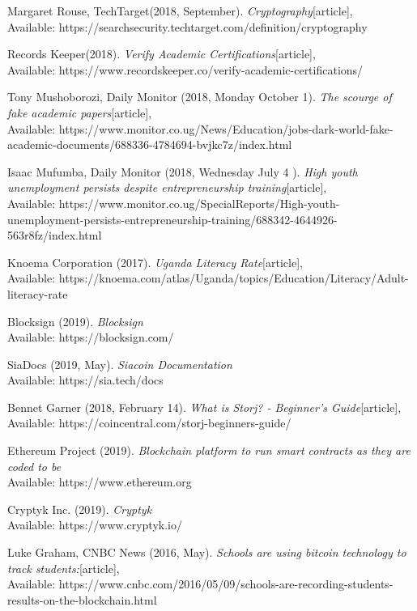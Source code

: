 \begin{thebibliography}{20}

Margaret Rouse, TechTarget(2018, September).
\emph{Cryptography}[article],\\
Available: {https://searchsecurity.techtarget.com/definition/cryptography}

 Records Keeper(2018).
\emph{Verify Academic Certifications}[article],\\
Available: {https://www.recordskeeper.co/verify-academic-certifications/}

 Tony Mushoborozi, Daily Monitor (2018, Monday October 1).
\emph{The scourge of fake academic papers}[article],\\
Available: {https://www.monitor.co.ug/News/Education/jobs-dark-world-fake-academic-documents/688336-4784694-bvjkc7z/index.html}

 Isaac Mufumba, Daily Monitor (2018, Wednesday July 4 ).
\emph{High youth unemployment persists despite entrepreneurship training}[article],\\
Available: {https://www.monitor.co.ug/SpecialReports/High-youth-unemployment-persists-entrepreneurship-training/688342-4644926-563r8fz/index.html}

 Knoema Corporation (2017).
\emph{Uganda Literacy Rate}[article],\\
Available: {https://knoema.com/atlas/Uganda/topics/Education/Literacy/Adult-literacy-rate}

 Blocksign (2019).
\emph{Blocksign}\\
Available: {https://blocksign.com/}

 SiaDocs (2019, May).
\emph{Siacoin Documentation}\\
Available: {https://sia.tech/docs}

 Bennet Garner (2018, February 14).
\emph{What is Storj? - Beginner’s Guide}[article],\\
Available: {https://coincentral.com/storj-beginners-guide/}

 Ethereum Project (2019).
\emph{Blockchain platform to run smart contracts as they are coded to be}\\
Available: {https://www.ethereum.org}

 Cryptyk Inc. (2019).
\emph{Cryptyk}\\
Available: {https://www.cryptyk.io/}

Luke Graham, CNBC News (2016, May).
\emph{Schools are using bitcoin technology to track students:}[article],\\
Available: {https://www.cnbc.com/2016/05/09/schools-are-recording-students-results-on-the-blockchain.html}


\end{thebibliography}
